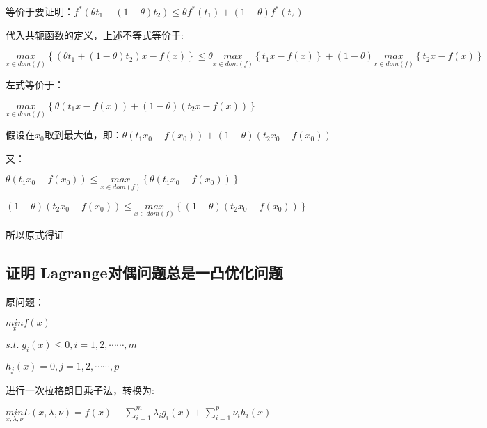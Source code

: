 \documentclass[12pt, a4paper, oneside, fontset=windows]{ctexart}
\begin{document}
等价于要证明：$f^{*}\left ( \theta t_{1}+\left ( 1-\theta  \right )t_{2} \right )\leq \theta f^{*}\left ( t_{1} \right )+\left ( 1-\theta  \right )f^{*}\left ( t_{2} \right )$

代入共轭函数的定义，上述不等式等价于:

$\underset{x \in  dom\left ( f \right )}{max}\left \{\left ( \theta t_{1}+\left ( 1-\theta  \right )t_{2} \right )x-f\left ( x \right )  \right \}\leq \theta \underset{x \in  dom\left ( f \right )}{max}\left \{t_{1} x-f\left ( x \right )  \right \} +\left ( 1-\theta  \right ) \underset{x \in  dom\left ( f \right )}{max}\left \{t_{2} x-f\left ( x \right )  \right \}$

左式等价于：

$\underset{x \in  dom\left ( f \right )}{max}\left \{ \theta \left ( t_{1}x-f\left ( x \right ) \right )+\left ( 1-\theta  \right ) \left ( t_{2}x-f\left ( x \right ) \right ) \right \}$

假设在$x_{0}$取到最大值，即：$\theta \left ( t_{1}x_{0}-f\left ( x_{0} \right ) \right )+\left ( 1-\theta  \right ) \left ( t_{2}x_{0}-f\left ( x_{0} \right ) \right ) $

又：

$\theta \left ( t_{1}x_{0}-f\left ( x_{0} \right ) \right )\leq  \underset{x \in  dom\left ( f \right )}{max}\left \{ \theta \left ( t_{1}x_{0}-f\left ( x_{0} \right ) \right ) \right \} $

$\left ( 1-\theta  \right ) \left ( t_{2}x_{0}-f\left ( x_{0} \right ) \right )\leq  \underset{x \in  dom\left ( f \right )}{max}\left \{ \left ( 1-\theta  \right )  \left ( t_{2}x_{0}-f\left ( x_{0} \right ) \right ) \right \} $

所以原式得证

\subsection{证明 Lagrange对偶问题总是一凸优化问题}
原问题：

$\underset{x}{min}f\left ( x \right )$

$s.t.\; g_{i}\left ( x \right )\leq 0,i=1,2,\cdots \cdots ,m$

$h_{j}\left ( x \right )=0,j=1,2,\cdots \cdots ,p$

进行一次拉格朗日乘子法，转换为:

$\underset{x,\lambda ,\nu }{min}L\left ( x,\lambda ,\nu  \right )=f\left ( x \right )+\sum_{i=1}^{m}\lambda _{i}g_{i}\left ( x \right )+\sum_{i=1}^{p}\nu  _{i}h_{i}\left ( x \right )$
\end{document}
